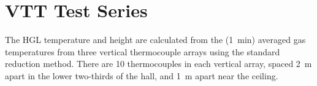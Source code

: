 %
%

\clearpage

\section{VTT Test Series}

The HGL temperature and height are calculated from the (1~min) averaged gas temperatures from three vertical thermocouple arrays using the standard reduction
method. There are 10 thermocouples in each vertical array, spaced 2~m apart in the lower two-thirds of the hall, and 1~m apart near the ceiling.

\newpage






